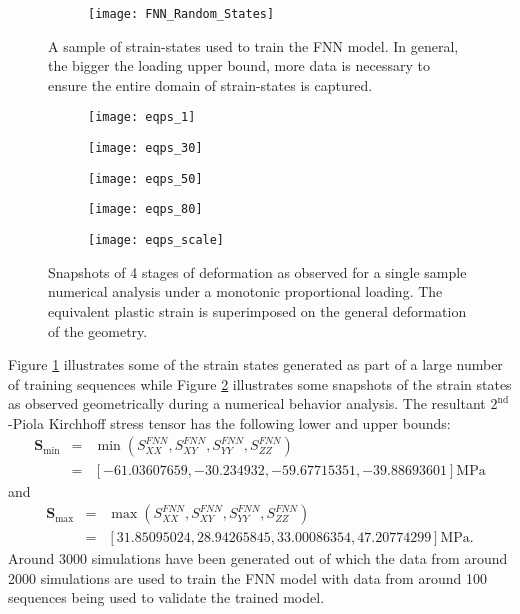 \begin{figure}
	\centering
	\begin{subfigure}[t]{0.75\textwidth}
		\texttt{[image: FNN\_Random\_States]}
	\end{subfigure}
	\caption{A sample of strain-states used to train the FNN model. In general, the bigger the loading upper bound, more data is necessary to ensure the entire domain of strain-states is captured.}\label{fig-nn-fnn1}
\end{figure}

\begin{figure}
	\centering
	\begin{subfigure}[t]{0.4\textwidth}
		\texttt{[image: eqps\_1]}
	\end{subfigure}
	\begin{subfigure}[t]{0.4\textwidth}
		\texttt{[image: eqps\_30]}
	\end{subfigure}
	\begin{subfigure}[t]{0.4\textwidth}
		\texttt{[image: eqps\_50]}
	\end{subfigure}
	\begin{subfigure}[t]{0.4\textwidth}
		\texttt{[image: eqps\_80]}
	\end{subfigure}
	\begin{subfigure}[t]{0.45\textwidth}
	\texttt{[image: eqps\_scale]}
\end{subfigure}
	\caption{Snapshots of 4 stages of deformation as observed for a single sample numerical analysis under a monotonic proportional loading. The equivalent plastic strain is superimposed on the general deformation of the geometry.}\label{fig-nn-fnn1-1}
\end{figure}
Figure \ref{fig-nn-fnn1} illustrates some of the strain states generated as part of a large number of training sequences while Figure \ref{fig-nn-fnn1-1} illustrates some snapshots of the strain states as observed geometrically during a numerical behavior analysis. The resultant $ 2^\text{nd} $-Piola Kirchhoff stress tensor has the following lower and upper bounds:
\begin{eqnarray}\label{eq-fnn-res3}
\textbf{S}_\text{min} & = & \min\left(S_{XX}^{FNN},S_{XY}^{FNN},S_{YY}^{FNN},S_{ZZ}^{FNN}\right)\nonumber\\
& = & \left[-61.03607659, -30.234932  , -59.67715351,-39.88693601\right]\text{MPa}\nonumber
\end{eqnarray}
and
\begin{eqnarray}\label{eq-fnn-res4}
\textbf{S}_\text{max} & = & \max\left(S_{XX}^{FNN},S_{XY}^{FNN},S_{YY}^{FNN},S_{ZZ}^{FNN}\right)\nonumber\\
& = & \left[31.85095024, 28.94265845 , 33.00086354,47.20774299\right]\text{MPa}.\nonumber
\end{eqnarray}
Around 3000 simulations have been generated out of which the data from around 2000 simulations are used to train the FNN model with data from around 100 sequences being used to validate the trained model.

